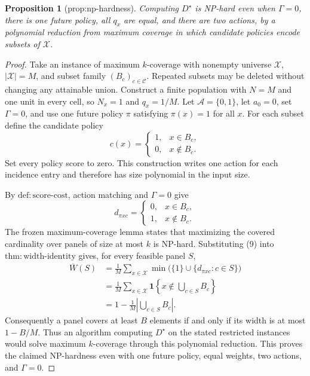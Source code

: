 \documentclass{article}
\newtheorem{proposition}{Proposition}
\begin{document}
\begin{proposition}[prop:np-hardness]\label{prop:np-hardness}
Computing \(D^{\star}\) is NP-hard even when \(\Gamma=0\), there is one future policy, all \(q_x\) are equal, and there are two actions, by a polynomial reduction from maximum coverage in which candidate policies encode subsets of \(\mathcal X\).
\end{proposition}
\begin{proof}
Take an instance of maximum \(k\)-coverage with nonempty universe
\(\mathcal X\), \(|\mathcal X|=M\), and subset family
\((B_c)_{c\in\mathcal C}\).  Repeated subsets may be deleted without
changing any attainable union.  Construct a finite population with
\(N=M\) and one unit in every cell, so \(N_x=1\) and \(q_x=1/M\).  Let
\(\mathcal A=\{0,1\}\), let \(a_0=0\), set \(\Gamma=0\), and use one
future policy \(\pi\) satisfying \(\pi(x)=1\) for all \(x\).  For each
subset define the candidate policy
\[
c(x)=
\begin{cases}
1,&x\in B_c,\\
0,&x\notin B_c.
\end{cases}
\]
Set every policy score to zero.  This construction writes one action for
each incidence entry and therefore has size polynomial in the input size.

By \(\mathrm{def{:}score\text{-}cost}\), action matching and
\(\Gamma=0\) give
\[
d_{\pi xc}=
\begin{cases}
0,&x\in B_c,\\
1,&x\notin B_c.
\end{cases}                                                           \tag{9}
\]
The frozen maximum-coverage lemma states that maximizing the covered
cardinality over panels of size at most \(k\) is NP-hard.  Substituting (9)
into \(\mathrm{thm{:}width\text{-}identity}\) gives, for every feasible
panel \(S\),
\[
\begin{aligned}
\overline W(S)
&=\frac1M\sum_{x\in\mathcal X}
  \min\bigl(\{1\}\cup\{d_{\pi xc}:c\in S\}\bigr)\\
&=\frac1M\sum_{x\in\mathcal X}
  \mathbf 1\!\left\{x\notin\bigcup_{c\in S}B_c\right\}\\
&=1-\frac1M\left|\bigcup_{c\in S}B_c\right|.                         \tag{10}
\end{aligned}
\]
Consequently a panel covers at least \(B\) elements if and only if its
width is at most \(1-B/M\).  Thus an algorithm computing \(D^\star\) on
the stated restricted instances would solve maximum \(k\)-coverage through
this polynomial reduction.  This proves the claimed NP-hardness even with
one future policy, equal weights, two actions, and \(\Gamma=0\).
\end{proof}
\end{document}
